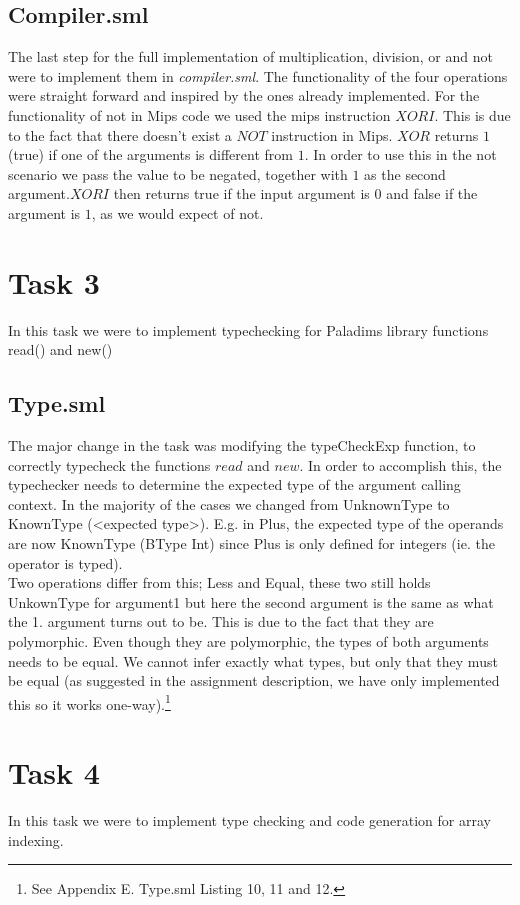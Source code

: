 \documentclass[12pt,a4paper,english]{article}
\begin{document}
\subsection{Compiler.sml}
The last step for the full implementation of multiplication, division, or and not were to implement them in \textit{compiler.sml}. The functionality of the four operations were straight forward and inspired by the ones already implemented. For the functionality of not in Mips code we used the mips instruction $XORI$. This is due to the fact that there doesn't exist a $NOT$ instruction in Mips. $XOR$ returns $1$ (true) if one of the arguments is different from $1$. In order to use this in the not scenario we pass the value to be negated, together with $1$ as the second argument.$XORI$ then returns true if the input argument is $0$ and false if the argument is $1$, as we would expect of not. 

\section{Task 3}
In this task we were to implement typechecking for Paladims library functions read() and new()

\subsection{Type.sml}
The major change in the task was modifying the typeCheckExp function, to correctly typecheck the functions $read$ and $new$. In order to accomplish this, the typechecker needs to determine the expected type of the argument calling context. In the majority of the cases we changed from UnknownType to KnownType (<expected type>). E.g. in Plus, the expected type of the operands are now KnownType (BType Int) since Plus is only defined for integers (ie. the operator is typed). \\

Two operations differ from this; Less and Equal, these two still holds UnkownType for argument1 but here the second argument is the same as what the 1. argument turns out to be. This is due to the fact that they are polymorphic. Even though they are polymorphic, the types of both arguments needs to be equal. We cannot infer exactly what types, but only that they must be equal (as suggested in the assignment description, we have only implemented this so it works one-way).\footnote{See Appendix E. Type.sml Listing 10, 11 and 12.}
\newpage
\section{Task 4}
In this task we were to implement type checking and code generation for array indexing. 
\end{document}
